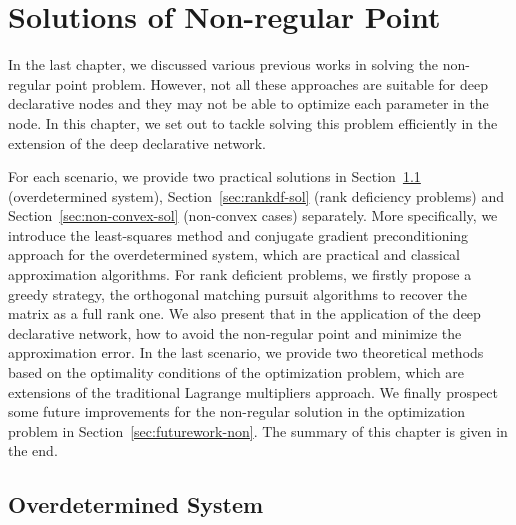 \chapter{Solutions of Non-regular Point}
\label{cha:result}
In the last chapter, we discussed various previous works in solving the non-regular point problem. However, not all these approaches are suitable for deep declarative nodes and they may not be able to optimize each parameter in the node. In this chapter, we set out to tackle solving this problem efficiently in the extension of the deep declarative network. 
\par For each scenario, we provide two practical solutions in Section~\ref{sec:overdet-sol} (overdetermined system), Section~\ref{sec:rankdf-sol} (rank deficiency problems) and Section~\ref{sec:non-convex-sol} (non-convex cases) separately. More specifically, we introduce the least-squares method and conjugate gradient preconditioning approach for the overdetermined system, which are practical and classical approximation algorithms. For rank deficient problems, we firstly propose a greedy strategy, the orthogonal matching pursuit algorithms to recover the matrix as a full rank one. We also present that in the application of the deep declarative network, how to avoid the non-regular point and minimize the approximation error. In the last scenario, we provide two theoretical methods based on the optimality conditions of the optimization problem, which are extensions of the traditional Lagrange multipliers approach. We finally prospect some future improvements for the non-regular solution in the optimization problem in Section~\ref{sec:futurework-non}. The summary of this chapter is given in the end. 

\section{Overdetermined System}
\label{sec:overdet-sol}
